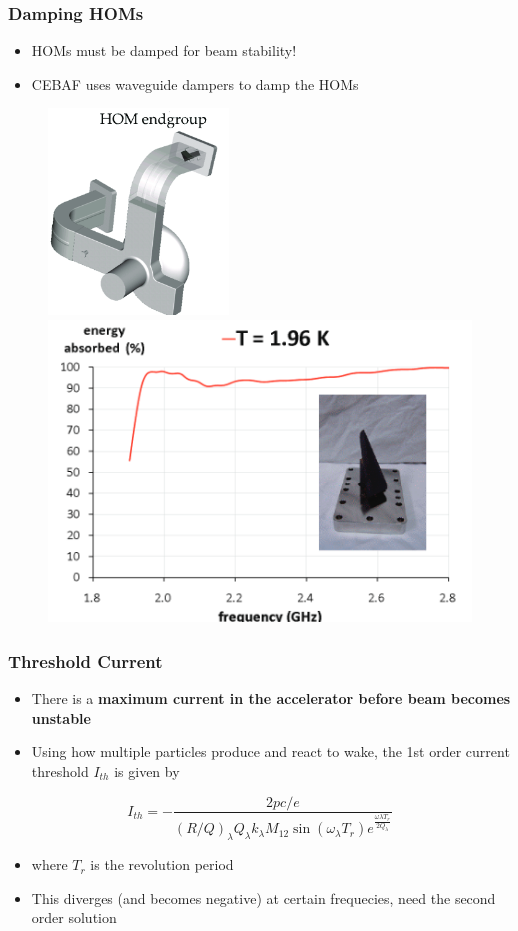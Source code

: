 \documentclass{beamer}
\begin{document}
\begin{frame}
\frametitle{Damping HOMs}
\begin{itemize}
\item HOMs must be damped for beam stability!
\item CEBAF uses waveguide dampers to damp the HOMs
\end{itemize}
\begin{figure}
\includegraphics[width=0.30\linewidth]{figs/HOM.png}
\includegraphics[width=0.50\linewidth]{figs/energy_absorbed.png}
\end{figure}
\end{frame}


\begin{frame}
\frametitle{Threshold Current}
\begin{itemize}
\item There is a \textbf{maximum current in the accelerator before beam becomes unstable}
\item Using how multiple particles produce and react to wake, the 1st order current threshold $I_{th}$ is given by 
\end{itemize}
\begin{equation}
I_{th}=-\frac{2pc/e}{(R/Q)_{\lambda} Q_{\lambda} k_{\lambda} M_{12} \sin{(\omega_{\lambda} T_r)} e^{\frac{\omega{\lambda}T_r}{2 Q_{\lambda}}}}
\end{equation}
\begin{itemize}
\item where $T_r$ is the revolution period
\item This diverges (and becomes negative) at certain frequecies, need the second order solution
\end{itemize}
\end{frame}
\end{document}
